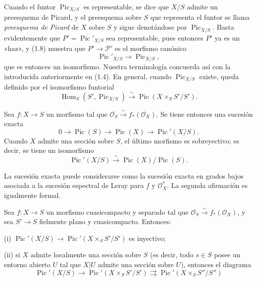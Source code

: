 Cuando el funtor $\operatorname{Pic}_{X/S}$ es representable, se dice que
$X/S$ admite un preesquema de Picard, y el preesquema sobre $S$ que representa
el funtor se llama \emph{preesquema de Picard} de $X$ sobre $S$ y sigue
denotándose por $\operatorname{Pic}_{X/S}$. Basta evidentemente que
$P'=\operatorname{Pic}'_{X/S}$ sea representable, pues entonces $P'$ ya es un
«haz», y (1.8) muestra que $P'\longrightarrow\mathcal P'$ es el morfismo
canónico
\begin{equation}
\operatorname{Pic}'_{X/S}\longrightarrow\operatorname{Pic}_{X/S},
\tag{1.9}
\end{equation}
que es entonces un isomorfismo. Nuestra terminología concuerda así con la
introducida anteriormente en (1.4). En general, cuando
$\operatorname{Pic}_{X/S}$ existe, queda definido por el isomorfismo funtorial
\begin{equation}
\operatorname{Hom}_S(S',\operatorname{Pic}_{X/S})\xrightarrow{\sim}
\operatorname{Pic}(X\times_SS'/S').
\tag{1.10}
\end{equation}


 Sea $f:X\longrightarrow S$ un morfismo tal que
$\mathcal O_S\xrightarrow{\sim}f_*(\mathcal O_X)$. Se tiene entonces una
sucesión exacta
\[
0\longrightarrow\operatorname{Pic}(S)\longrightarrow\operatorname{Pic}(X)
\longrightarrow\operatorname{Pic}'(X/S).
\]
Cuando $X$ admite una sección sobre $S$, el último morfismo es sobreyectivo;
es decir, se tiene un isomorfismo
\[
\operatorname{Pic}'(X/S)\xrightarrow{\sim}
\operatorname{Pic}(X)/\operatorname{Pic}(S).
\]

La sucesión exacta puede considerarse como la sucesión exacta en grados bajos
asociada a la sucesión espectral de Leray para $f$ y $\mathcal O_X^*$. La
segunda afirmación es igualmente formal.

 Sea $f:X\longrightarrow S$ un morfismo cuasicompacto
y separado tal que $\mathcal O_S\xrightarrow{\sim}f_*(\mathcal O_X)$, y sea
$S'\longrightarrow S$ fielmente plano y cuasicompacto. Entonces:

\noindent (i) $\operatorname{Pic}'(X/S)\longrightarrow
\operatorname{Pic}'(X\times_SS'/S')$ es inyectivo;

\noindent (ii) si $X$ admite localmente una sección sobre $S$ (es decir, todo
$s\in S$ posee un entorno abierto $U$ tal que $X|U$ admite una sección sobre
$U$), entonces el diagrama
\[
\operatorname{Pic}'(X/S)\longrightarrow
\operatorname{Pic}'(X\times_SS'/S')\rightrightarrows
\operatorname{Pic}'(X\times_SS''/S'')
\]

